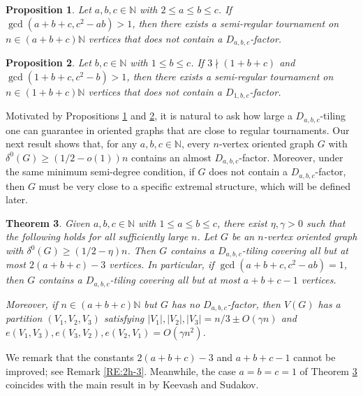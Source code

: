 \documentclass[11pt,a4paper,reqno]{amsart}
\newtheorem{theorem}{Theorem}[section]
\newtheorem{proposition}[theorem]{Proposition}
\theoremstyle{definition} %
\begin{document}
\begin{proposition}\label{PRO-abcexamplegraph}
Let $a,b,c\in \mathbb{N}$ with $2\leqslant a\leqslant b\leqslant c$. If $\gcd(a+b+c,c^2-ab)>1$, then there exists a semi-regular tournament on \(n\in (a+b+c)\mathbb{N}\) vertices that does not contain a \(D_{a,b,c}\)-factor.
\end{proposition}

\begin{proposition}\label{PRO-1bcexamplegraph}
Let $b,c\in \mathbb{N}$ with $1\leqslant b\leqslant c$. If \(3\nmid (1+b+c)\) and \(\gcd(1+b+c,c^2-b)>1\), then there exists a semi-regular tournament on \(n\in (1+b+c)\mathbb{N}\) vertices that does not contain a \(D_{1,b,c}\)-factor.
\end{proposition}

Motivated by Propositions \ref{PRO-abcexamplegraph} and \ref{PRO-1bcexamplegraph}, it is natural to ask how large a \(D_{a,b,c}\)-tiling one can guarantee in oriented graphs that are close to regular tournaments. 
Our next result shows that, for any \(a,b,c\in \mathbb{N}\), every \(n\)-vertex oriented graph \(G\) with \(\delta^0(G)\geqslant (1/2-o(1))n\) contains an almost \(D_{a,b,c}\)-factor. 
Moreover, under the same minimum semi-degree condition, if \(G\) does not contain a \(D_{a,b,c}\)-factor, then \(G\) must be very close to a specific extremal structure, which will be defined later.


\begin{theorem}\label{THM:factor-extremal}
Given \(a,b,c\in \mathbb{N}\) with \(1\leqslant a \leqslant b \leqslant c\), there exist \(\eta,\gamma>0\) such that the following holds for all sufficiently large \(n\). Let \(G\) be an \(n\)-vertex oriented graph with \(\delta^0(G)\geqslant (1/2-\eta)n\). Then \(G\) contains a \(D_{a,b,c}\)-tiling covering all but at most \(2(a+b+c)-3\) vertices. In particular, if \(\gcd(a+b+c,c^2-ab)=1\), then \(G\) contains a \(D_{a,b,c}\)-tiling covering all but at most \(a+b+c-1\) vertices.

Moreover, if $n\in (a+b+c)\mathbb{N}$ but $G$ has no $D_{a,b,c}$-factor, then $V(G)$ has a partition $(V_1,V_2,V_3)$ satisfying  $|V_1|,|V_2|,|V_3| = n/3 \pm O(\gamma n)$ and $e(V_1,V_3),e(V_3,V_2),e(V_2,V_1) = O(\gamma n^2)$.
\end{theorem}


We remark that the constants $2(a+b+c)-3$ and $a+b+c-1$ cannot be improved; see Remark \ref{RE:2h-3}.
Meanwhile, the case $a=b=c=1$ of Theorem \ref{THM:factor-extremal} coincides with the main result in \cite{keevashJCTB99} by Keevash and Sudakov.
\end{document}
